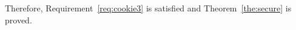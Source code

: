 Therefore, Requirement~\ref{req:cookie3} is satisfied and Theorem~\ref{the:secure} is proved.

\begin{comment}
\subsection{Proof of Theorem~\ref{the:privacy}}
In this section, we give a detailed proof about the privacy of UPPRESSO. That is,  UPPRESSO is a privacy-preserving system, satisfying IdP-Privacy and RP-Privacy. As analyzed above,  the requirements of IdP-Privacy and RP-Privacy are as follows. 
\begin{req}
\textbf{IdP-Privacy}. There are honest RPs $r_1, r_2$, IdP $i$ and the honest user $u$. We define the event sets containing each users' login procedure, for instance, the \myss{events_{(u, r_1)}} consists of all the events generated during the \myss{u} logging in to \myss{r_1} in correct procedure. IdP-Privacy requires that for every event $e_1 \in events_{(u, r_1)}$ received by IdP, there is always an  event $e_2 \in events_{(u, r_2)}$, satisfying that $e_1$ and $e_2$ are equivalent.
\label{req:idp}
\end{req}
Here we give the proof that UPPRESSO system meets Requirement~\ref{req:idp}.
\begin{proof}
As IdP is honest, we only need to analyze the events sent to the IdP, to prove the equivalence of these events. The IdP only accepts the HTTPS requests to the path \myss{/script, /synamicRegistration, /login, loginInfo} and \myss{/authorize}, which are examined  as follows.
\begin{itemize}
\item \myss{/script}. Based on Algorithm~\ref{alg1}, we can find that every request to this path does not carry any parameter and body. Therefore, for event $e_1 \in events_{(u, r_1)}$ and $e_2 \in events_{(u, r_2)}$, the HTTPS messages in \myss{e_1} and \myss{e_2} meet the requirements in Definition~\ref{def:httpequ}, so \myss{e_1} and \myss{e_2} are equivalent.
\item \myss{/loginInfo}. As defined in Algorithm~\ref{alg1}, no parameters and bodies are sent to this path. The proof is same as the path \myss{/script}.
\item \myss{/login}. According to Algorithm~\ref{alg1}, the requests carry the body including \myss{u}'s username and password. For event $e_1 \in events_{(u, r_1)}$ and $e_2 \in events_{(u, r_2)}$, the usernames and passwords must be the same. Therefore, \myss{e_1} and \myss{e_2} are equivalent.

\end{comment}
